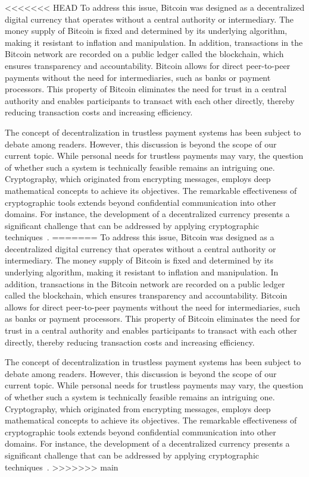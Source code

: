 <<<<<<< HEAD
To address this issue, Bitcoin was designed as a decentralized digital currency that operates without a central authority or intermediary. The money supply of Bitcoin is fixed and determined by its underlying algorithm, making it resistant to inflation and manipulation. In addition, transactions in the Bitcoin network are recorded on a public ledger called the blockchain, which ensures transparency and accountability. Bitcoin allows for direct peer-to-peer payments without the need for intermediaries, such as banks or payment processors. This property of Bitcoin eliminates the need for trust in a central authority and enables participants to transact with each other directly, thereby reducing transaction costs and increasing efficiency.

The concept of decentralization in trustless payment systems has been subject to debate among readers. However, this discussion is beyond the scope of our current topic. While personal needs for trustless payments may vary, the question of whether such a system is technically feasible remains an intriguing one. Cryptography, which originated from encrypting messages, employs deep mathematical concepts to achieve its objectives. The remarkable effectiveness of cryptographic tools extends beyond confidential communication into other domains. For instance, the development of a decentralized currency presents a significant challenge that can be addressed by applying cryptographic techniques~\cite{diffie2022new}.
=======
To address this issue, Bitcoin was designed as a decentralized digital currency that operates without a central authority
or intermediary. The money supply of Bitcoin is fixed and determined by its underlying algorithm, making it resistant to
inflation and manipulation. In addition, transactions in the Bitcoin network are recorded on a public ledger called the
blockchain, which ensures transparency and accountability. Bitcoin allows for direct peer-to-peer payments without the need
for intermediaries, such as banks or payment processors. This property of Bitcoin eliminates the need for trust in a central
authority and enables participants to transact with each other directly, thereby reducing transaction costs and increasing
efficiency.

The concept of decentralization in trustless payment systems has been subject to debate among readers. However, this discussion
is beyond the scope of our current topic. While personal needs for trustless payments may vary, the question of whether
such a system is technically feasible remains an intriguing one. Cryptography, which originated from encrypting messages,
employs deep mathematical concepts to achieve its objectives. The remarkable effectiveness of cryptographic tools extends
beyond confidential communication into other domains. For instance, the development of a decentralized currency presents
a significant challenge that can be addressed by applying cryptographic techniques~\cite{diffie2022new}.
>>>>>>> main


